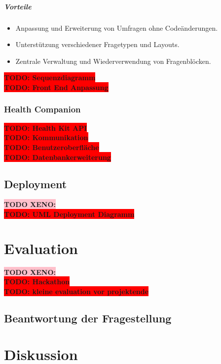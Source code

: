 \documentclass[12pt,a4paper]{report}
\newcommand{\todo}[1]{\colorbox{red}{\textbf{TODO: #1}}\\}
\newcommand{\xeno}[1]{\colorbox{pink}{\textbf{TODO XENO: #1}}\\}
\begin{document}
\paragraph{Vorteile}
    \begin{itemize}
        \item Anpassung und Erweiterung von Umfragen ohne Codeänderungen.
        \item Unterstützung verschiedener Fragetypen und Layouts.
        \item Zentrale Verwaltung und Wiederverwendung von Fragenblöcken.
    \end{itemize}


\todo{Sequenzdiagramm}
\todo{Front End Anpassung}

\subsection{Health Companion}

\todo{Health Kit API}
\todo{Kommunikation}
\todo{Benutzeroberfläche}
\todo{Datenbankerweiterung}

\section{Deployment}
\xeno{}
\todo{UML Deployment Diagramm}

\chapter{Evaluation}
\xeno{}
\todo{Hackathon}
\todo{kleine evaluation vor projektende}
\section{Beantwortung der Fragestellung}

\chapter{Diskussion}

\printbibliography
\end{document}
